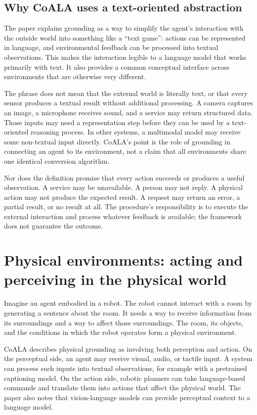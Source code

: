 \subsection{Why CoALA uses a text-oriented abstraction}

The paper explains grounding as a way to simplify the agent's interaction with the outside world into something like a ``text game'': actions can be represented in language, and environmental feedback can be processed into textual observations. This makes the interaction legible to a language model that works primarily with text. It also provides a common conceptual interface across environments that are otherwise very different.

The phrase does not mean that the external world is literally text, or that every sensor produces a textual result without additional processing. A camera captures an image, a microphone receives sound, and a service may return structured data. Those inputs may need a representation step before they can be used by a text-oriented reasoning process. In other systems, a multimodal model may receive some non-textual input directly. CoALA's point is the role of grounding in connecting an agent to its environment, not a claim that all environments share one identical conversion algorithm.

Nor does the definition promise that every action succeeds or produces a useful observation. A service may be unavailable. A person may not reply. A physical action may not produce the expected result. A request may return an error, a partial result, or no result at all. The procedure's responsibility is to execute the external interaction and process whatever feedback is available; the framework does not guarantee the outcome.

\section{Physical environments: acting and perceiving in the physical world}
\label{sec:physical-environments}

Imagine an agent embodied in a robot. The robot cannot interact with a room by generating a sentence about the room. It needs a way to receive information from its surroundings and a way to affect those surroundings. The room, its objects, and the conditions in which the robot operates form a physical environment.

CoALA describes physical grounding as involving both perception and action. On the perceptual side, an agent may receive visual, audio, or tactile input. A system can process such inputs into textual observations, for example with a pretrained captioning model. On the action side, robotic planners can take language-based commands and translate them into actions that affect the physical world. The paper also notes that vision-language models can provide perceptual context to a language model.

